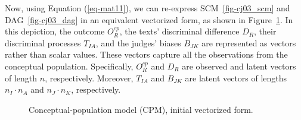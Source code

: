 \documentclass[
  authoryear,
  review,
  1p]{elsarticle}
\begin{document}
Now, using Equation (\ref{eq-mat11}), we can re-express
SCM~\ref{fig-cj03_scm} and DAG~\ref{fig-cj03_dag} in an equivalent
vectorized form, as shown in Figure~\ref{fig-cj04}. In this depiction,
the outcome \(O^{cp}_{R}\), the texts' discriminal difference \(D_{R}\),
their discriminal processes \(T_{IA}\), and the judges' biases
\(B_{JK}\) are represented as vectors rather than scalar values. These
vectors capture all the observations from the conceptual population.
Specifically, \(O^{cp}_{R}\) and \(D_{R}\) are observed and latent
vectors of length \(n\), respectively. Moreover, \(T_{IA}\) and
\(B_{JK}\) are latent vectors of lengths \(n_{I} \cdot n_{A}\) and
\(n_{J} \cdot n_{K}\), respectively.

\begin{figure}[H]

\begin{minipage}{0.50\linewidth}

\centering{

\[
\begin{aligned}
  O^{cp}_{R} & := f_{O}(D_{R}) \\
  D_{R} & := f_{D}(T_{IA}, B_{JK})
\end{aligned}
\]

}


\end{minipage}%
%
\begin{minipage}{0.50\linewidth}



\end{minipage}%

\caption{\label{fig-cj04}Conceptual-population model (CPM), initial
vectorized form.}

\end{figure}%
\end{document}
